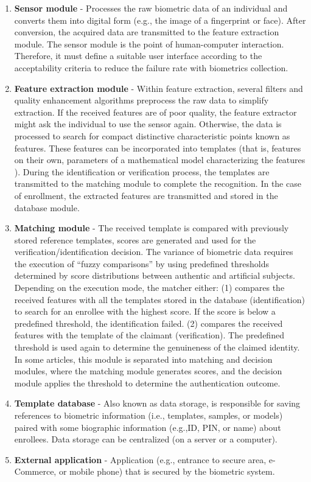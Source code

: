 \label{BiometricModules}
\begin{enumerate}
    \item \textbf{Sensor module} - Processes the raw biometric data of an individual and converts them into digital form (e.g., the image of a fingerprint or face). After conversion, the acquired data are transmitted to the feature extraction module.
    The sensor module is the point of human-computer interaction. Therefore, it must define a suitable user interface according to the acceptability criteria to reduce the failure rate with biometrics collection. 
    \item \textbf{Feature extraction module} - Within feature extraction, several filters and quality enhancement algorithms preprocess the raw data to simplify extraction. If the received features are of poor quality, the feature extractor might ask the individual to use the sensor again. Otherwise, the data is processed to search for compact distinctive characteristic points known as features. These features can be incorporated into templates (that is, features on their own, parameters of a mathematical model characterizing the features \cite{BiometricAuthentication}). During the identification or verification process, the templates are transmitted to the matching module to complete the recognition. In the case of enrollment, the extracted features are transmitted and stored in the database module.
    \item  \textbf{Matching module} - The received template is compared with previously stored reference templates, scores are generated and used for the verification/identification decision. The variance of biometric data requires the execution of ``fuzzy comparisons'' by using predefined thresholds determined by score distributions between authentic and artificial subjects.  Depending on the execution mode, the matcher either: (1) compares the received features with all the templates stored in the database (identification) to search for an enrollee with the highest score. If the score is below a predefined threshold, the identification failed.
    (2) compares the received features with the template of the claimant (verification). The predefined threshold is used again to determine the genuineness of the claimed identity. In some articles, this module is separated into matching and decision modules, where the matching module generates scores, and the decision module applies the threshold to determine the authentication outcome. %
    \item  \textbf{Template database} - Also known as data storage, is responsible for saving references to biometric information (i.e., templates, samples, or models) paired with some biographic information (e.g.,ID, PIN, or name) about enrollees. Data storage can be centralized (on a server or a computer).
    \item  \textbf{External application} - Application (e.g., entrance to secure area, e-Commerce, or mobile phone) that is secured by the biometric system. 
\end{enumerate}



